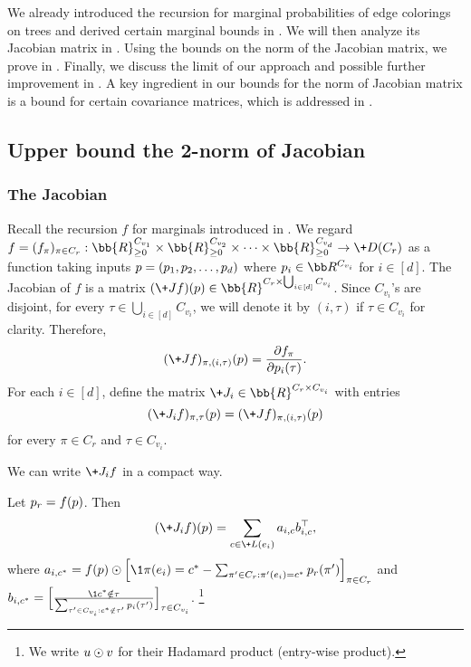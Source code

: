 \documentclass[a4paper,11pt]{article}
\begin{document}
We already introduced the recursion for marginal probabilities of edge colorings on trees and derived certain marginal bounds in .  We will then analyze its Jacobian matrix in . Using the bounds on the norm of the Jacobian matrix, we prove  in . Finally, we discuss the limit of our approach and possible further improvement in . A key ingredient in our bounds for the norm of Jacobian matrix is a bound for certain covariance matrices, which is addressed in . 


\subsection{Upper bound the 2-norm of Jacobian}\label{sec:jacobian}

\subsubsection{The Jacobian}
Recall the recursion $f$ for marginals introduced in . We regard $f=(f_\pi)_{\pi \in C_r}: \bb{R}_{\geq 0}^{C_{v_1}}\times \bb{R}_{\geq 0}^{C_{v_2}}\times \cdots \times \bb{R}_{\geq 0}^{C_{v_d}} \rightarrow \+D(C_{r})$
as a function taking inputs $\*p = (\*p_1, \*p_2, \dots, \*p_d)$ where $\*p_i\in \bb R^{C_{v_i}}$ for $i\in [d]$. The Jacobian of $f$ is a matrix $(\+J f)(\*p) \in \bb{R}^{C_r\times \bigcup_{i\in [d]} C_{v_i}}$. Since $C_{v_i}$'s are disjoint, for every $\tau \in \bigcup_{i\in [d]} C_{v_i}$, we will denote it by $(i,\tau)$ if $\tau\in C_{v_i}$ for clarity. Therefore, 
\begin{equation*}
    (\+J f)_{\pi,(i,\tau)}(\*p)= \frac{\partial f_\pi}{\partial \*p_{i}(\tau)}.
\end{equation*}
For each $i\in [d]$, define the matrix $\+J_i \in \bb{R}^{C_r\times C_{v_i}}$ with entries
\begin{equation*}
    (\+J_i f)_{\pi,\tau}(\*p) = (\+J f)_{\pi,(i,\tau)}(\*p)
\end{equation*}
for every $\pi\in C_r$ and $\tau\in C_{v_i}$. 

\bigskip
We can write $\+J_if$ in a compact way. 
\begin{proposition} 
Let $\*p_r = f(\*p)$. Then
\begin{align*}
    (\+J_i f)(\*p)=\sum_{c\in \+L(e_i)}\*a_{i,c} \*b_{i,c}^{\top},
\end{align*}
where $\*a_{i,c^*}=f(\*p) \odot \Big[\1{\pi(e_i)=c^*}-\sum_{\pi' \in C_{r}: \pi'(e_i)=c^*}\*p_r(\pi')\Big]_{\pi\in C_r}$
and $\*b_{i,c^*}=\Big[\frac{\1{c^*\notin \tau}}{\sum_{\tau' \in C_{v_i}: c^*\notin \tau'}\*p_i(\tau')} \Big]_{\tau\in C_{v_i}}$. \footnote{We write $\*u \odot \*v$ for their Hadamard product (entry-wise product).}
\end{proposition}
\end{document}
